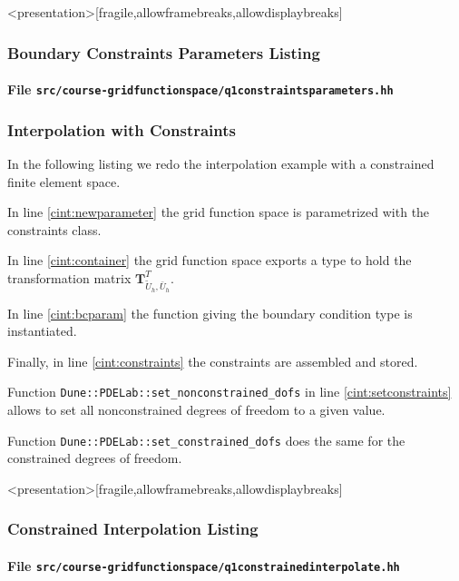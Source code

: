 \begin{frame}<presentation>[fragile,allowframebreaks,allowdisplaybreaks]
\frametitle<presentation>{Boundary Constraints Parameters Listing}
\framesubtitle<presentation>{File \texttt{src/course-gridfunctionspace/q1constraintsparameters.hh}}

\end{frame}

\begin{frame}
\frametitle<presentation>{Interpolation with Constraints}
In the following listing we redo the interpolation example 
with a constrained finite element space.

In line \ref{cint:newparameter} the grid function space is
parametrized with the constraints class.

In line \ref{cint:container} the grid function space exports a type to
hold the transformation matrix
$\mathbf{T}^T_{\tilde{U}_h,\bar{U}_h}$. 

In line \ref{cint:bcparam} the function giving the boundary
condition type is instantiated.

Finally, in line \ref{cint:constraints} the constraints are assembled
and stored.

Function \lstinline{Dune::PDELab::set_nonconstrained_dofs} in
line \ref{cint:setconstraints} allows to set all nonconstrained
degrees of freedom to a given value.

Function \lstinline{Dune::PDELab::set_constrained_dofs} does the same
for the constrained degrees of freedom.
\end{frame}


\begin{frame}<presentation>[fragile,allowframebreaks,allowdisplaybreaks]
\frametitle<presentation>{Constrained Interpolation Listing}
\framesubtitle<presentation>{File \texttt{src/course-gridfunctionspace/q1constrainedinterpolate.hh}}

\end{frame}

